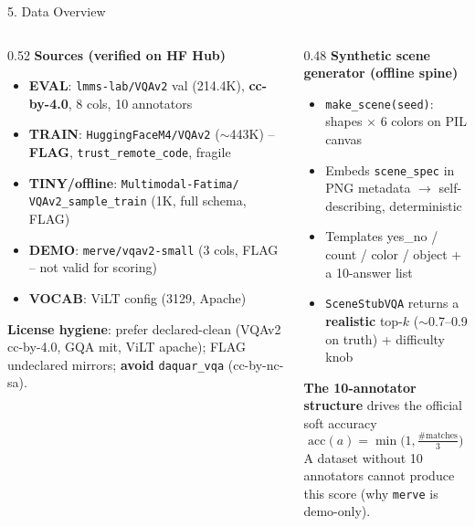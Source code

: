 \documentclass[10pt,aspectratio=169]{beamer}
\begin{document}
\begin{frame}{5. Data Overview}
\begin{columns}[T]
\begin{column}{0.52\textwidth}
\textbf{Sources (verified on HF Hub)}
\begin{itemize}\scriptsize
  \item \textbf{EVAL}: \texttt{lmms-lab/VQAv2} val (214.4K), \textbf{cc-by-4.0}, 8 cols, 10 annotators
  \item \textbf{TRAIN}: \texttt{HuggingFaceM4/VQAv2} ($\sim$443K) -- \textbf{FLAG}, \texttt{trust\_remote\_code}, fragile
  \item \textbf{TINY/offline}: \texttt{Multimodal-Fatima/} \texttt{VQAv2\_sample\_train} (1K, full schema, FLAG)
  \item \textbf{DEMO}: \texttt{merve/vqav2-small} (3 cols, FLAG -- not valid for scoring)
  \item \textbf{VOCAB}: ViLT config (3129, Apache)
\end{itemize}
\textbf{License hygiene}: prefer declared-clean (VQAv2 cc-by-4.0, GQA mit, ViLT apache); FLAG undeclared mirrors; \textbf{avoid} \texttt{daquar\_vqa} (cc-by-nc-sa).
\end{column}
\begin{column}{0.48\textwidth}
\textbf{Synthetic scene generator (offline spine)}
\begin{itemize}\scriptsize
  \item \texttt{make\_scene(seed)}: shapes $\times$ 6 colors on PIL canvas
  \item Embeds \texttt{scene\_spec} in PNG metadata $\rightarrow$ self-describing, deterministic
  \item Templates yes\_no / count / color / object + a 10-answer list
  \item \texttt{SceneStubVQA} returns a \textbf{realistic} top-$k$ ($\sim$0.7--0.9 on truth) + difficulty knob
\end{itemize}
\textbf{The 10-annotator structure} drives the official soft accuracy
\[
\mathrm{acc}(a)=\min\!\Big(1,\tfrac{\#\text{matches}}{3}\Big)
\]
A dataset without 10 annotators cannot produce this score (why \texttt{merve} is demo-only).
\end{column}
\end{columns}
\end{frame}
\end{document}
